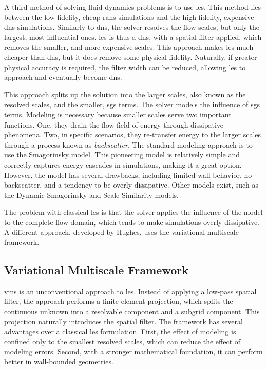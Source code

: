 A third method of solving fluid dynamics problems is to use \gls{les}.
This method lies between the low-fidelity, cheap \gls{rans} simulations and the high-fidelity, expensive \gls{dns} simulations.
Similarly to \gls{dns}, the solver resolves the flow scales, but only the largest, most influential ones. \gls{les} is thus a \gls{dns}, with a spatial filter applied, which removes the smaller, and more expensive scales.
This approach makes \gls{les} much cheaper than \gls{dns}, but it does remove some physical fidelity.
Naturally, if greater physical accuracy is required, the filter width can be reduced, allowing \gls{les} to approach and eventually become \gls{dns}.

This approach splits up the solution into the larger scales, also known as the resolved scales, and the smaller, \gls{sgs} terms.
The solver models the influence of \gls{sgs} terms.
Modeling is necessary because smaller scales serve two important functions.
One, they drain the flow field of energy through dissipative phenomena.
Two, in specific scenarios, they re-transfer energy to the larger scales through a process known as \emph{backscatter}.
The standard modeling approach is to use the Smagorinsky model.
This pioneering model is relatively simple and correctly captures energy cascades in simulations, making it a great option.
However, the model has several drawbacks, including limited wall behavior, no backscatter, and a tendency to be overly dissipative.
Other models exist, such as the Dynamic Smagorinsky and Scale Similarity models.

The problem with classical \gls{les} is that the solver applies the influence of the model to the complete flow domain, which tends to make simulations overly dissipative.
A different approach, developed by Hughes, uses the variational multiscale framework.

\subsection{Variational Multiscale Framework} \label{subsec:vms}


\gls{vms} is an unconventional approach to \gls{les}.
Instead of applying a low-pass spatial filter, the approach performs a finite-element projection, which splits the continuous unknown into a resolvable component and a subgrid component.
This projection naturally introduces the spatial filter.
The framework has several advantages over a classical \gls{les} formulation.
First, the effect of modeling is confined only to the smallest resolved scales, which can reduce the effect of modeling errors.
Second, with a stronger mathematical foundation, it can perform better in wall-bounded geometries.

